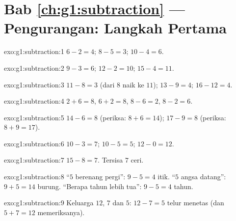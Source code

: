 \section*{Bab \ref{ch:g1:subtraction} --- Pengurangan: Langkah Pertama}

\begin{solution}{exo:g1:subtraction:1}
$6 - 2 = 4$; \quad $8 - 5 = 3$; \quad $10 - 4 = 6$.
\end{solution}

\begin{solution}{exo:g1:subtraction:2}
$9 - 3 = 6$; \quad $12 - 2 = 10$; \quad $15 - 4 = 11$.
\end{solution}

\begin{solution}{exo:g1:subtraction:3}
$11 - 8 = 3$ (dari $8$ naik ke $11$); \quad
$13 - 9 = 4$; \quad $16 - 12 = 4$.
\end{solution}

\begin{solution}{exo:g1:subtraction:4}
$2 + 6 = 8$, \quad $6 + 2 = 8$, \quad $8 - 6 = 2$, \quad
$8 - 2 = 6$.
\end{solution}

\begin{solution}{exo:g1:subtraction:5}
$14 - 6 = 8$ (periksa: $8 + 6 = 14$); \quad
$17 - 9 = 8$ (periksa: $8 + 9 = 17$).
\end{solution}

\begin{solution}{exo:g1:subtraction:6}
$10 - 3 = 7$; \quad $10 - 5 = 5$; \quad $12 - 0 = 12$.
\end{solution}

\begin{solution}{exo:g1:subtraction:7}
$15 - 8 = 7$. Tersisa $7$ ceri.
\end{solution}

\begin{solution}{exo:g1:subtraction:8}
``$5$ berenang pergi'': $9 - 5 = 4$ itik. ``$5$ angsa datang'':
$9 + 5 = 14$ burung. ``Berapa tahun lebih tua'': $9 - 5 = 4$ tahun.
\end{solution}

\begin{solution}{exo:g1:subtraction:9}
Keluarga $12$, $7$ dan $5$: $12 - 7 = 5$ telur menetas (dan
$5 + 7 = 12$ memeriksanya).

\end{solution}
